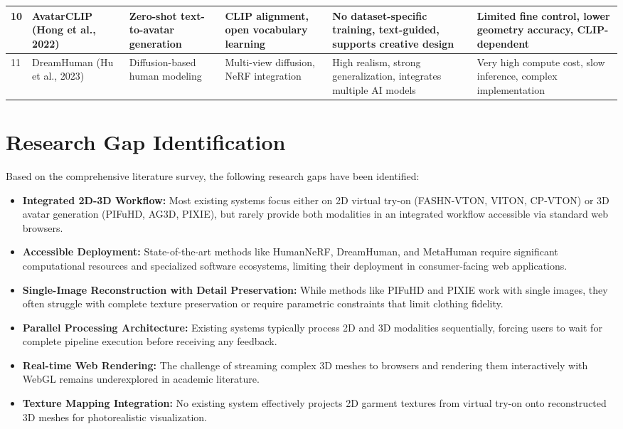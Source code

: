 \documentclass[12pt,a4paper,oneside]{report}
\begin{document}
\begin{center}
\begin{longtable}{|p{0.1cm}|p{1.9cm}|p{2.0cm}|p{2.0cm}|p{2.0cm}|p{2.0cm}|}
\hline
10 & AvatarCLIP (Hong et al., 2022) & Zero-shot text-to-avatar generation & CLIP alignment, open vocabulary learning & No dataset-specific training, text-guided, supports creative design & Limited fine control, lower geometry accuracy, CLIP-dependent \\
\hline
11 & DreamHuman (Hu et al., 2023) & Diffusion-based human modeling & Multi-view diffusion, NeRF integration & High realism, strong generalization, integrates multiple AI models & Very high compute cost, slow inference, complex implementation \\
\hline
\end{longtable}
\end{center}

\section{Research Gap Identification}

Based on the comprehensive literature survey, the following research gaps have been identified:

\begin{itemize}
    \item \textbf{Integrated 2D-3D Workflow:} Most existing systems focus either on 2D virtual try-on (FASHN-VTON, VITON, CP-VTON) or 3D avatar generation (PIFuHD, AG3D, PIXIE), but rarely provide both modalities in an integrated workflow accessible via standard web browsers.

    \item \textbf{Accessible Deployment:} State-of-the-art methods like HumanNeRF, DreamHuman, and MetaHuman require significant computational resources and specialized software ecosystems, limiting their deployment in consumer-facing web applications.

    \item \textbf{Single-Image Reconstruction with Detail Preservation:} While methods like PIFuHD and PIXIE work with single images, they often struggle with complete texture preservation or require parametric constraints that limit clothing fidelity.

    \item \textbf{Parallel Processing Architecture:} Existing systems typically process 2D and 3D modalities sequentially, forcing users to wait for complete pipeline execution before receiving any feedback.

    \item \textbf{Real-time Web Rendering:} The challenge of streaming complex 3D meshes to browsers and rendering them interactively with WebGL remains underexplored in academic literature.

    \item \textbf{Texture Mapping Integration:} No existing system effectively projects 2D garment textures from virtual try-on onto reconstructed 3D meshes for photorealistic visualization.
\end{itemize}
\end{document}
